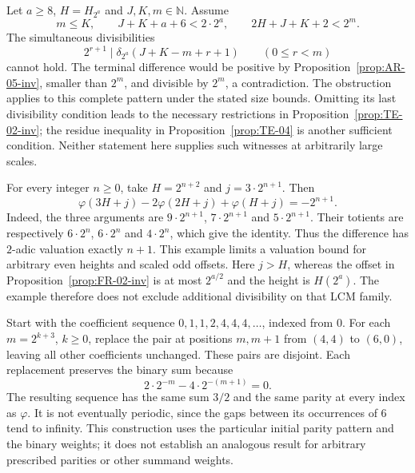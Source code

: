 \begin{obs}\label{prop:TE-01-killer}
Let $a\ge8$, $H=H_{2^a}$ and $J,K,m\in\mathbb N$. Assume
\[
 m\le K,\qquad J+K+a+6<2\cdot2^a,\qquad
 2H+J+K+2<2^m.
\]
The simultaneous divisibilities
\[
 2^{r+1}\mid\delta_{2^a}(J+K-m+r+1)\qquad(0\le r<m)
\]
cannot hold. The terminal difference would be positive by
Proposition~\ref{prop:AR-05-inv}, smaller than $2^m$, and divisible by
$2^m$, a contradiction. The obstruction applies to this complete
pattern under the stated size bounds. Omitting its last divisibility
condition leads to the necessary restrictions in
Proposition~\ref{prop:TE-02-inv}; the residue inequality in
Proposition~\ref{prop:TE-04} is another sufficient condition. Neither
statement here supplies such witnesses at arbitrarily large scales.
\end{obs}

\begin{obs}\label{prop:FR-03-kill}
For every integer $n\ge0$, take $H=2^{n+2}$ and $j=3\cdot2^{n+1}$.
Then
\[
 \varphi(3H+j)-2\varphi(2H+j)+\varphi(H+j)=-2^{n+1}.
\]
Indeed, the three arguments are $9\cdot2^{n+1}$,
$7\cdot2^{n+1}$ and $5\cdot2^{n+1}$. Their totients are respectively
$6\cdot2^n$, $6\cdot2^n$ and $4\cdot2^n$, which give the identity.
Thus the difference has $2$-adic valuation exactly $n+1$.
This example limits a valuation bound for arbitrary even heights and
scaled odd offsets. Here $j>H$, whereas the offset in
Proposition~\ref{prop:FR-02-inv} is at most $2^{a/2}$ and the height is
$H(2^a)$. The example therefore does not exclude additional divisibility
on that LCM family.
\end{obs}

\begin{obs}\label{prop:CM-01}

Start with the coefficient sequence $0,1,1,2,4,4,4,\ldots$, indexed
from $0$. For each $m=2^{k+3}$, $k\ge0$, replace the pair at positions
$m,m+1$ from $(4,4)$ to $(6,0)$, leaving all other coefficients unchanged.
These pairs are disjoint. Each replacement preserves the binary sum because
\[
 2\cdot2^{-m}-4\cdot2^{-(m+1)}=0.
\]
The resulting sequence has the same sum $3/2$ and the same parity at
every index as $\varphi$. It is not eventually periodic, since the gaps
between its occurrences of $6$ tend to infinity. This construction uses
the particular initial parity pattern and the binary weights; it does
not establish an analogous result for arbitrary prescribed parities or
other summand weights.
\end{obs}

